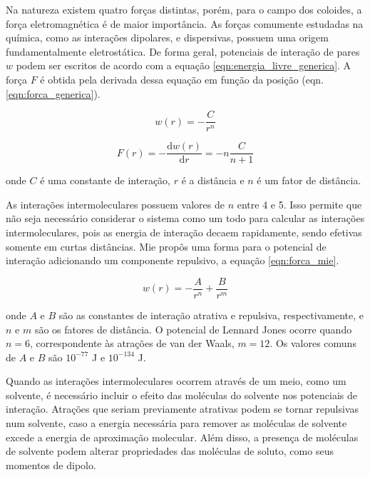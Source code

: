 	Na natureza existem quatro forças distintas, porém, para o campo dos coloides, a força eletromagnética é de maior importância. As forças comumente estudadas na química, como as interações dipolares, e dispersivas, possuem uma origem fundamentalmente eletrostática. De forma geral, potenciais de interação de pares \(w\) podem ser escritos de acordo com a equação \ref{eqn:energia_livre_generica}. A força \(F\) é obtida pela derivada dessa equação em função da posição (eqn. \ref{eqn:forca_generica}).
	
	\begin{equation}
		w(r) = -\dfrac{C}{r^n}
		\label{eqn:energia_livre_generica}
	\end{equation} 
	
	\begin{equation}
		F(r) = -\dfrac{\mathrm{d}w(r)}{\mathrm{d}r} = -n \dfrac{C}{n+1}
		\label{eqn:forca_generica}
	\end{equation} 
	
	\noindent onde \(C\) é uma constante de interação, \(r\) é a distância e \(n\) é um fator de distância.
	
	As interações intermoleculares possuem valores de \(n\) entre 4 e 5. Isso permite que não seja necessário considerar o sistema como um todo para calcular as interações intermoleculares, pois as energia de interação decaem rapidamente, sendo efetivas somente em curtas distâncias. Mie propôs uma forma para o potencial de interação adicionando um componente repulsivo, a equação \ref{eqn:forca_mie}.
	
	\begin{equation}
		w(r) = -\dfrac{A}{r^n} + \dfrac{B}{r^m}
		\label{eqn:forca_mie}
	\end{equation}
	
	\noindent onde \(A\) e \(B\) são as constantes de interação atrativa e repulsiva, respectivamente, e \(n\) e \(m\) são os fatores de distância. O potencial de Lennard Jones ocorre quando \(n = 6\),  correspondente às atrações de van der Waals, \(m = 12\). Os valores comuns de \(A\) e \(B\) são \(10^{-77}\) J e \(10^{-134}\) J. %
	
	Quando as interações intermoleculares ocorrem através de um meio, como um solvente, é necessário incluir o efeito das moléculas do solvente nos potenciais de interação. Atrações que seriam previamente atrativas podem se tornar repulsivas num solvente, caso a energia necessária para remover as moléculas de solvente excede a energia de aproximação molecular. Além disso, a presença de moléculas de solvente podem alterar propriedades das moléculas de soluto, como seus momentos de dipolo.
	
